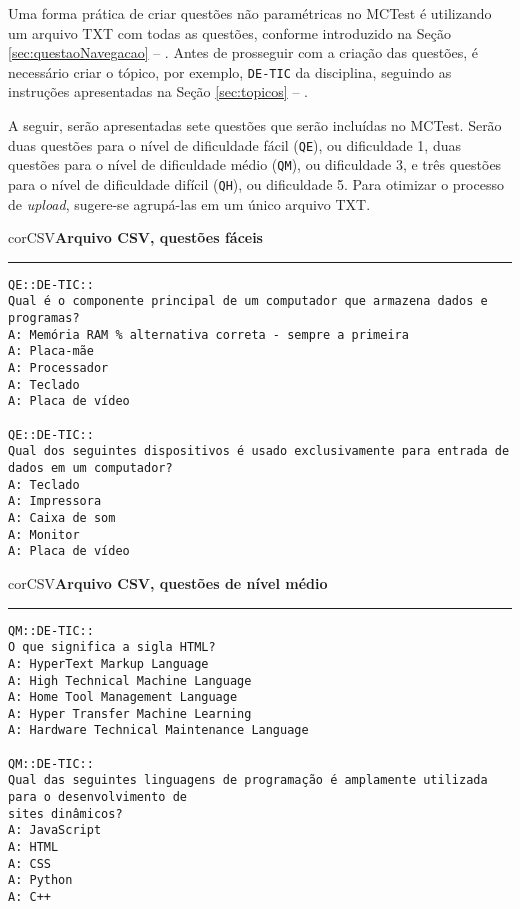 Uma forma prática de criar questões não paramétricas no MCTest é utilizando um arquivo TXT com todas as questões, conforme introduzido na Seção \ref{sec:questaoNavegacao} -- . Antes de prosseguir com a criação das questões, é necessário criar o tópico, por exemplo, \verb|DE-TIC| da disciplina, seguindo as instruções apresentadas na Seção \ref{sec:topicos} -- . 

A seguir, serão apresentadas sete questões que serão incluídas no MCTest. Serão duas questões para o nível de dificuldade fácil (\verb|QE|), ou dificuldade 1, duas questões para o nível de dificuldade médio (\verb|QM|), ou dificuldade 3, e três questões para o nível de dificuldade difícil (\verb|QH|), ou dificuldade 5. Para otimizar o processo de \textit{upload}, sugere-se agrupá-las em um único arquivo TXT.

\begin{myboxCode}{corCSV}{\textbf{Arquivo CSV, questões fáceis }}\vspace{3mm}
\hrule
{\footnotesize
\begin{verbatim}
QE::DE-TIC:: 
Qual é o componente principal de um computador que armazena dados e programas?
A: Memória RAM % alternativa correta - sempre a primeira
A: Placa-mãe
A: Processador
A: Teclado
A: Placa de vídeo

QE::DE-TIC:: 
Qual dos seguintes dispositivos é usado exclusivamente para entrada de dados em um computador?
A: Teclado 
A: Impressora
A: Caixa de som
A: Monitor
A: Placa de vídeo
\end{verbatim}
}
\end{myboxCode}

\begin{myboxCode}{corCSV}{\textbf{Arquivo CSV, questões de nível médio }}\vspace{3mm}
\hrule
{\footnotesize
\begin{verbatim}
QM::DE-TIC:: 
O que significa a sigla HTML?
A: HyperText Markup Language
A: High Technical Machine Language
A: Home Tool Management Language
A: Hyper Transfer Machine Learning
A: Hardware Technical Maintenance Language

QM::DE-TIC:: 
Qual das seguintes linguagens de programação é amplamente utilizada para o desenvolvimento de 
sites dinâmicos?
A: JavaScript
A: HTML
A: CSS
A: Python
A: C++
\end{verbatim}
}
\end{myboxCode}

